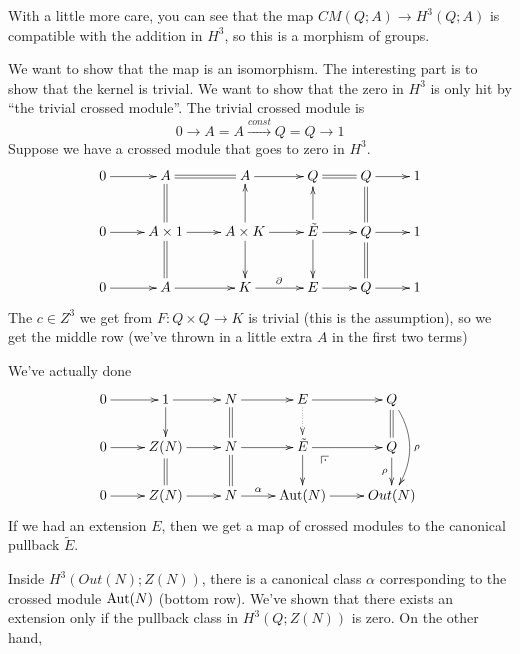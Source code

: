 With a little more care, you can see that the map $CM(Q;A)\to H^3(Q;A)$ is compatible with the addition in $H^3$, so this is a morphism of groups.

We want to show that the map is an isomorphism. The interesting part is to show that the kernel is trivial. We want to show that the zero in $H^3$ is only hit by ``the trivial crossed module''. The trivial crossed module is
\[
 0\to A=A\xrightarrow{const} Q=Q\to 1
\]
Suppose we have a crossed module that goes to zero in $H^3$.
\[\xymatrix{
 0\ar[r] & A \ar@{=}[r] & A\ar[r] & Q\ar@{=}[r] & Q\ar[r] & 1\\
 0\ar[r] & A\times 1\ar@{=}[u]\ar[r]\ar@{=}[d] & A\times K\ar[u]\ar[d]\ar[r] & \tilde E\ar[d]\ar[u]\ar[r] & Q\ar@{=}[d]\ar@{=}[u] \ar[r] & 1\\
 0\ar[r] & A\ar[r] & K\ar[r]^\partial & E\ar[r] & Q\ar[r] & 1
}\]
The $c\in Z^3$ we get from $F\colon Q\times Q\to K$ is trivial (this is the assumption), so we get the middle row (we've thrown in a little extra $A$ in the first two terms)

We've actually done
\[\xymatrix @R-.5pc{
 0\ar[r]& 1\ar[r]\ar[d]& N\ar@{=}[d] \ar[r] & E\ar[r] \ar@{.>}[d] & Q\ar@/^3ex/[dd]^\rho\\
 0\ar[r]&Z(N)\ar[r]\ar@{=}[d] & N\ar@{=}[d]\ar[r] & \tilde E\ar@{}[dr]|(.25)\pb \ar[r]\ar[d] & Q\ar[d]_\rho \ar@{=}[u] \\
 0\ar[r]&Z(N)\ar[r] & N\ar[r]^-\alpha & \Aut(N)\ar[r] & Out(N)
}\]
If we had an extension $E$, then we get a map of crossed modules to the canonical pullback $\tilde E$.

Inside $H^3(Out(N);Z(N))$, there is a canonical class $\alpha$ corresponding to the crossed module $\operatorname{Aut}(N)$ (bottom row). We've shown that there exists an extension only if the pullback class in $H^3(Q;Z(N))$ is zero. On the other hand, 






